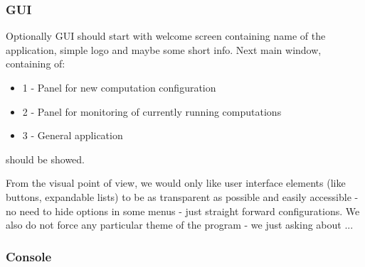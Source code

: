 \documentclass{article}
\begin{document}
\subsubsection{GUI}
Optionally GUI should start with welcome screen containing name of the application, simple logo and maybe some short info. Next main window, containing of:
\begin{itemize} 
\item 1 - Panel for new computation configuration
\item 2 - Panel for monitoring of currently running computations
\item 3 - General application 
\end{itemize} 
should be showed. 

From the visual point of view, we would only like user interface elements (like buttons, expandable lists) to be as transparent as possible and easily accessible - no need to hide options in some menus - just straight forward configurations. We also do not force any particular theme of the program - we just asking about ...

\subsubsection{Console}
\end{document}
